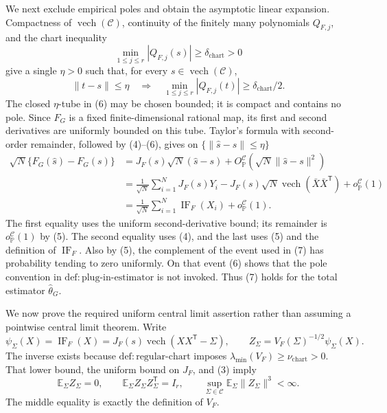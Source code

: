 We next exclude empirical poles and obtain the asymptotic linear expansion.  Compactness of \(\operatorname{vech}(\mathcal C)\), continuity of the finitely many polynomials \(Q_{F,j}\), and the chart inequality
\[
 \min_{1\le j\le r}|Q_{F,j}(s)|\ge\delta_{\mathrm{chart}}>0
\]
give a single \(\eta>0\) such that, for every \(s\in\operatorname{vech}(\mathcal C)\),
\[
 \lVert t-s\rVert\le\eta
 \quad\Longrightarrow\quad
 \min_{1\le j\le r}|Q_{F,j}(t)|\ge\delta_{\mathrm{chart}}/2.
\tag{6}
\]
The closed \(\eta\)-tube in (6) may be chosen bounded; it is compact and contains no pole.  Since \(F_G\) is a fixed finite-dimensional rational map, its first and second derivatives are uniformly bounded on this tube.  Taylor's formula with second-order remainder, followed by (4)--(6), gives on \(\{\lVert\widehat s-s\rVert\le\eta\}\)
\[
\begin{aligned}
 \sqrt N\{F_G(\widehat s)-F_G(s)\}
 &=J_F(s)\sqrt N(\widehat s-s)
   +O_{\mathbb P}^{\mathcal C}\!\left(\sqrt N\lVert\widehat s-s\rVert^2\right)\\
 &=\frac1{\sqrt N}\sum_{i=1}^N J_F(s)Y_i
   -J_F(s)\sqrt N\operatorname{vech}(\bar X\bar X^{\mathsf T})
   +o_{\mathbb P}^{\mathcal C}(1)\\
 &=\frac1{\sqrt N}\sum_{i=1}^N\operatorname{IF}_F(X_i)
   +o_{\mathbb P}^{\mathcal C}(1).
\end{aligned}
\tag{7}
\]
The first equality uses the uniform second-derivative bound; its remainder is \(o_{\mathbb P}^{\mathcal C}(1)\) by (5).  The second equality uses (4), and the last uses (5) and the definition of \(\operatorname{IF}_F\).  Also by (5), the complement of the event used in (7) has probability tending to zero uniformly.  On that event (6) shows that the pole convention in \(\mathrm{def:plug\mbox{-}in\mbox{-}estimator}\) is not invoked.  Thus (7) holds for the total estimator \(\widehat\theta_G\).

We now prove the required uniform central limit assertion rather than assuming a pointwise central limit theorem.  Write
\[
 \psi_{\Sigma}(X)=\operatorname{IF}_F(X)
 =J_F(s)\operatorname{vech}(XX^{\mathsf T}-\Sigma),
 \qquad
 Z_{\Sigma}=V_F(\Sigma)^{-1/2}\psi_{\Sigma}(X).
\]
The inverse exists because \(\mathrm{def:regular\mbox{-}chart}\) imposes
\(\lambda_{\min}(V_F)\ge\nu_{\mathrm{chart}}>0\).  That lower bound, the uniform bound on \(J_F\), and (3) imply
\[
 \mathbb E_{\Sigma}Z_{\Sigma}=0,
 \qquad
 \mathbb E_{\Sigma}Z_{\Sigma}Z_{\Sigma}^{\mathsf T}=I_r,
 \qquad
 \sup_{\Sigma\in\mathcal C}\mathbb E_{\Sigma}\lVert Z_{\Sigma}\rVert^3<\infty.
\tag{8}
\]
The middle equality is exactly the definition of \(V_F\).

